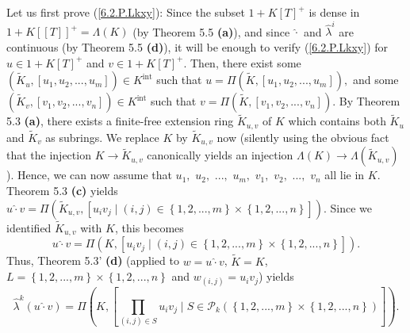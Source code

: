 \documentclass[numbers=enddot,12pt,final,onecolumn,notitlepage]{scrartcl}%
\begin{document}
Let us first prove (\ref{6.2.P.Lkxy}): Since the subset $1+K\left[  T\right]
^{+}$ is dense in $1+K\left[  \left[  T\right]  \right]  ^{+}=\Lambda\left(
K\right)  $ (by Theorem 5.5 \textbf{(a)}), and since $\widehat{\cdot}$ and
$\widehat{\lambda}^{i}$ are continuous (by Theorem 5.5 \textbf{(d)}), it will
be enough to verify (\ref{6.2.P.Lkxy}) for $u\in1+K\left[  T\right]  ^{+}$ and
$v\in1+K\left[  T\right]  ^{+}$. Then, there exist some $\left(
\widetilde{K}_{u},\left[  u_{1},u_{2},...,u_{m}\right]  \right)  \in
K^{\operatorname*{int}}$ such that $u=\Pi\left(  \widetilde{K},\left[
u_{1},u_{2},...,u_{m}\right]  \right)  ,$ and some $\left(  \widetilde{K}%
_{v},\left[  v_{1},v_{2},...,v_{n}\right]  \right)  \in K^{\operatorname*{int}%
}$ such that $v=\Pi\left(  \widetilde{K},\left[  v_{1},v_{2},...,v_{n}\right]
\right)  .$ By Theorem 5.3 \textbf{(a)}, there exists a finite-free extension
ring $\widetilde{K}_{u,v}$ of $K$ which contains both $\widetilde{K}_{u}$ and
$\widetilde{K}_{v}$ as subrings. We replace $K$ by $\widetilde{K}_{u,v}$ now
(silently using the obvious fact that the injection $K\rightarrow
\widetilde{K}_{u,v}$ canonically yields an injection $\Lambda\left(  K\right)
\rightarrow\Lambda\left(  \widetilde{K}_{u,v}\right)  $). Hence, we can now
assume that $u_{1},$ $u_{2},$ $...,$ $u_{m},$ $v_{1},$ $v_{2},$ $...,$ $v_{n}$
all lie in $K$. Theorem 5.3 \textbf{(c)} yields $u\widehat{\cdot}v=\Pi\left(
\widetilde{K}_{u,v},\left[  u_{i}v_{j}\mid\left(  i,j\right)  \in\left\{
1,2,...,m\right\}  \times\left\{  1,2,...,n\right\}  \right]  \right)  $.
Since we identified $\widetilde{K}_{u,v}$ with $K$, this becomes%
\[
u\widehat{\cdot}v=\Pi\left(  K,\left[  u_{i}v_{j}\mid\left(  i,j\right)
\in\left\{  1,2,...,m\right\}  \times\left\{  1,2,...,n\right\}  \right]
\right)  .
\]
Thus, Theorem 5.3' \textbf{(d)} (applied to $w=u\widehat{\cdot}v$,
$\widetilde{K}=K$, $L=\left\{  1,2,...,m\right\}  \times\left\{
1,2,...,n\right\}  $ and $w_{\left(  i,j\right)  }=u_{i}v_{j}$) yields%
\[
\widehat{\lambda}^{k}\left(  u\widehat{\cdot}v\right)  =\Pi\left(  K,\left[
\prod_{\left(  i,j\right)  \in S}u_{i}v_{j}\mid S\in\mathcal{P}_{k}\left(
\left\{  1,2,...,m\right\}  \times\left\{  1,2,...,n\right\}  \right)
\right]  \right)  .
\]
\end{document}
